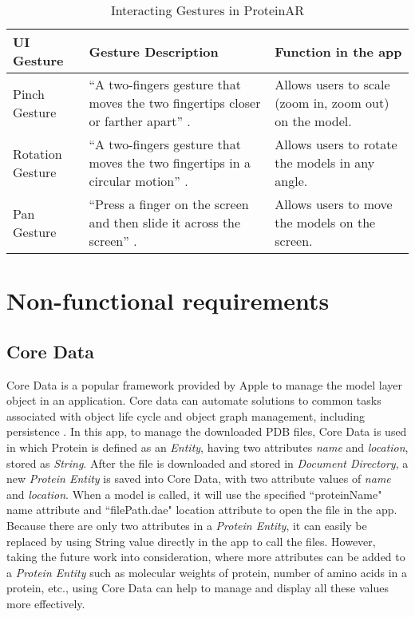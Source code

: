 \begin{table}[h!]
\centering
\begin{tabularx}{\textwidth} {
  | >{\raggedright\arraybackslash}X 
  | >{\raggedright\arraybackslash}X 
  | >{\raggedright\arraybackslash}X | }
\hline
UI Gesture & Gesture Description & Function in the app \\
\hline
\hline
Pinch Gesture & “A two-fingers gesture that moves the two fingertips closer or farther apart” \parencite{wang_beginning_2018}. & Allows users to scale (zoom in, zoom out) on the model. \\
\hline
Rotation Gesture & “A two-fingers gesture that moves the two fingertips in a circular motion” \parencite{wang_beginning_2018}. & Allows users to rotate the models in any angle. \\
\hline
Pan Gesture & “Press a finger on the screen and then slide it across the screen” \parencite{wang_beginning_2018}. & Allows users to move the models on the screen. \\
\hline
\end{tabularx}
\caption {Interacting Gestures in ProteinAR}
\label{tab:gesture}
\end{table}


\section{Non-functional requirements}
\subsection{Core Data}
Core Data is a popular framework provided by Apple to manage the model layer object in an application. 
Core data can automate solutions to common tasks associated with object life cycle and object graph management, including persistence \parencite{noauthor_core_nodate}. In this app, to manage the downloaded PDB files, Core Data is used in which Protein is defined as an \emph{Entity}, having two attributes \emph{name} and \emph{location}, stored as \emph{String}. After the file is downloaded and stored in \emph{Document Directory}, a new \emph{Protein Entity} is saved into Core Data, with two attribute values of \emph{name} and \emph{location}. When a model is called, it will use the specified ``proteinName" name attribute and ``filePath.dae" location attribute to open the file in the app. 
Because there are only two attributes in a \emph{Protein Entity}, it can easily be replaced by using String value directly in the app to call the files. However, taking the future work into consideration, where more attributes can be added to a \emph{Protein Entity} such as molecular weights of protein, number of amino acids in a protein, etc., using Core Data can help to manage and display all these values more effectively.

